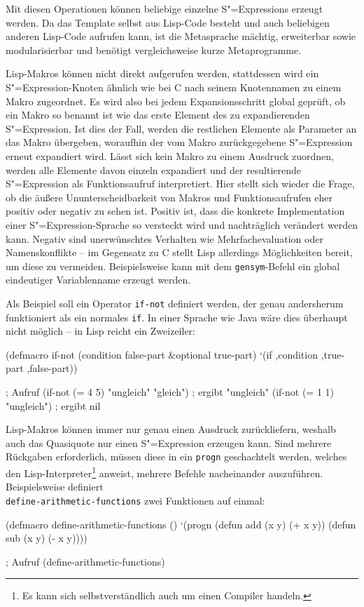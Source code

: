 \documentclass[12pt, a4paper, bibgerm]{scrbook}
\newenvironment{DIFnomarkup}{}{}
\newcommand\icode[1]{\lstinline?#1?}
\newcommand{\sexp}{S"=Expression}
\newcommand{\sexps}{S"=Expressions}
\begin{document}
Mit diesen Operationen können beliebige einzelne \sexps{} erzeugt
werden. Da das Template selbst aus Lisp-Code besteht und auch beliebigen
anderen Lisp-Code aufrufen kann, ist die Metasprache mächtig,
erweiterbar sowie modularisierbar und benötigt vergleichsweise kurze
Metaprogramme.

Lisp-Makros können nicht direkt aufgerufen werden, stattdessen wird ein
\sexp{}-Knoten ähnlich wie bei C nach seinem Knotennamen zu einem Makro
zugeordnet. Es wird also bei jedem Expansionsschritt global geprüft, ob
ein Makro so benannt ist wie das erste Element des zu expandierenden
\sexp{}. Ist dies der Fall, werden die restlichen Elemente als Parameter
an das Makro übergeben, woraufhin der vom Makro zurückgegebene \sexp{}
erneut expandiert wird. Lässt sich kein Makro zu einem Ausdruck
zuordnen, werden alle Elemente davon einzeln expandiert und der
resultierende \sexp{} als Funktionsaufruf interpretiert. Hier stellt
sich wieder die Frage, ob die äußere Ununterscheidbarkeit von Makros und
Funktionsaufrufen eher positiv oder negativ zu sehen ist. Positiv ist,
dass die konkrete Implementation einer \sexp{}-Sprache so versteckt wird
und nachträglich verändert werden kann. Negativ sind unerwünschtes
Verhalten wie Mehrfachevaluation oder Namenskonflikte -- im Gegensatz zu
C stellt Lisp allerdings Möglichkeiten bereit, um diese zu
vermeiden. Beispielsweise kann mit dem \icode{gensym}-Befehl ein global
eindeutiger Variablenname erzeugt werden.

Als Beispiel soll ein Operator \icode{if-not} definiert werden, der
genau andersherum funktioniert als ein normales \icode{if}. In einer
Sprache wie Java wäre dies überhaupt nicht möglich -- in Lisp reicht ein
Zweizeiler:

\begin{code}
(defmacro if-not (condition false-part &optional true-part)
  `(if ,condition ,true-part ,false-part))

; Aufruf
(if-not (= 4 5) "ungleich" "gleich")  ; ergibt "ungleich"  
(if-not (= 1 1) "ungleich")           ; ergibt nil
\end{code}

Lisp-Makros können immer nur genau einen Ausdruck zurückliefern, weshalb
auch das Quasiquote nur einen \sexp{} erzeugen kann. Sind mehrere
Rückgaben erforderlich, müssen diese in ein \icode{progn} geschachtelt
werden, welches den Lisp-Interpreter\footnote{Es kann sich
  selbstverständlich auch um einen Compiler handeln.} anweist, mehrere
Befehle nacheinander auszuführen. Beispielsweise definiert \\
\icode{define-arithmetic-functions} zwei Funktionen auf einmal:
\begin{DIFnomarkup}\begin{code}
(defmacro define-arithmetic-functions ()
  `(progn (defun add (x y) (+ x y))
          (defun sub (x y) (- x y))))


; Aufruf
(define-arithmetic-functions)
\end{code}\end{DIFnomarkup}
\end{document}
